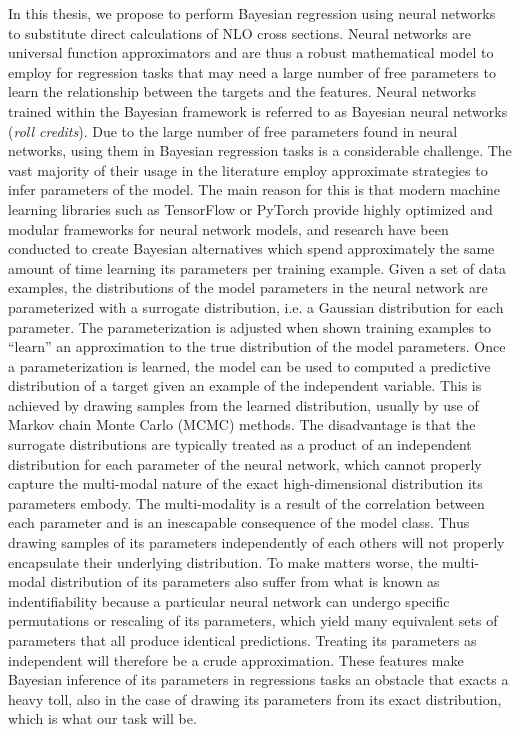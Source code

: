 In this thesis, we propose to perform Bayesian regression using neural networks to substitute direct calculations of NLO cross sections. Neural networks are universal function approximators \cite{universal_function_approximator} and are thus a robust mathematical model to employ for regression tasks that may need a large number of free parameters to learn the relationship between the targets and the features.
Neural networks trained within the Bayesian framework is referred to as Bayesian neural networks (\textit{roll credits}). Due to the large number of free parameters found in neural networks, using them in Bayesian regression tasks is a considerable challenge. The vast majority of their usage in the literature employ approximate strategies to infer parameters of the model. The main reason for this is that modern machine learning libraries such as TensorFlow or PyTorch provide highly optimized and modular frameworks for neural network models, and research have been conducted to create Bayesian alternatives which spend approximately the same amount of time learning its parameters per training example. Given a set of data examples, the distributions of the model parameters in the neural network are parameterized with a surrogate distribution, i.e. a Gaussian distribution for each parameter. The parameterization is adjusted when shown training examples to ``learn'' an approximation to the true distribution of the model parameters. Once a parameterization is learned, the model can be used to computed a predictive distribution of a target given an example of the independent variable. This is achieved by drawing samples from the learned distribution, usually by use of Markov chain Monte Carlo (MCMC) methods. The disadvantage is that the surrogate distributions are typically treated as a product of an independent distribution for each parameter of the neural network, which cannot properly capture the multi-modal nature of the exact high-dimensional distribution its parameters embody. The multi-modality is a result of the correlation between each parameter and is an inescapable consequence of the model class. Thus drawing samples of its parameters independently of each others will not properly encapsulate their underlying distribution. 
To make matters worse, the multi-modal distribution of its parameters also suffer from what is known as indentifiability because a particular neural network can undergo specific permutations or rescaling of its parameters, which yield many equivalent sets of parameters that all produce identical predictions. Treating its parameters as independent will therefore be a crude approximation. These features make Bayesian inference of its parameters in regressions tasks an obstacle that exacts a heavy toll, also in the case of drawing its parameters from its exact distribution, which is what our task will be.


